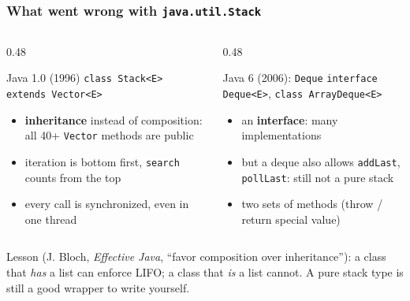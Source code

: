 \documentclass[aspectratio=169,10pt,compress]{beamer}
\begin{document}
\begin{frame}[t,fragile] \frametitle{What went wrong with \texttt{java.util.Stack}}
  \begin{columns}[T]
    \begin{column}{0.48\textwidth}
      \begin{block}{Java 1.0 (1996)}
        \small \texttt{class Stack<E> extends Vector<E>}
        \begin{itemize}\small
          \item \textbf{inheritance} instead of composition: all 40+ \texttt{Vector} methods are public
          \item iteration is bottom first, \texttt{search} counts from the top
          \item every call is synchronized, even in one thread
        \end{itemize}
      \end{block}
    \end{column}
    \begin{column}{0.48\textwidth}
      \begin{block}{Java 6 (2006): \texttt{Deque}}
        \small \texttt{interface Deque<E>}, \texttt{class ArrayDeque<E>}
        \begin{itemize}\small
          \item an \textbf{interface}: many implementations
          \item but a deque also allows \texttt{addLast}, \texttt{pollLast}: still not a pure stack
          \item two sets of methods (throw / return special value)
        \end{itemize}
      \end{block}
    \end{column}
  \end{columns}
  \vspace{0.3em}
  \small Lesson (J. Bloch, \emph{Effective Java}, ``favor composition over inheritance''): a class that \emph{has} a list
  can enforce LIFO; a class that \emph{is} a list cannot. A pure stack type is still a good wrapper to write yourself.
\end{frame}

\end{document}
